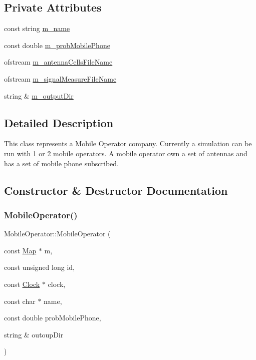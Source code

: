 \subsection*{Private Attributes}
\begin{DoxyCompactItemize}
\item 
const string \hyperlink{class_mobile_operator_adc9bb6e834adbaf7f85ad7cf9e4c9bec}{m\+\_\+name}
\item 
const double \hyperlink{class_mobile_operator_a4061b50b15ec5499d57ef0e85687c1a2}{m\+\_\+prob\+Mobile\+Phone}
\item 
ofstream \hyperlink{class_mobile_operator_abd11e27d3ed1273be761a55da1549fa4}{m\+\_\+antenna\+Cells\+File\+Name}
\item 
ofstream \hyperlink{class_mobile_operator_af9c02c4088656c0f21ecc93b7023e776}{m\+\_\+signal\+Measure\+File\+Name}
\item 
string \& \hyperlink{class_mobile_operator_a5930a7aec20f9a9c043b955cc705dce7}{m\+\_\+output\+Dir}
\end{DoxyCompactItemize}


\subsection{Detailed Description}
This class represents a Mobile Operator company. Currently a simulation can be run with 1 or 2 mobile operators. A mobile operator own a set of antennas and has a set of mobile phone subscribed. 

\subsection{Constructor \& Destructor Documentation}
\mbox{\label{class_mobile_operator_ad9649aeb34789b407d712a1539f7953d}} 
\subsubsection{\texorpdfstring{Mobile\+Operator()}{MobileOperator()}}
{\footnotesize\ttfamily Mobile\+Operator\+::\+Mobile\+Operator (\begin{DoxyParamCaption}\item[{const \hyperlink{class_map}{Map} $\ast$}]{m,  }\item[{const unsigned long}]{id,  }\item[{const \hyperlink{class_clock}{Clock} $\ast$}]{clock,  }\item[{const char $\ast$}]{name,  }\item[{const double}]{prob\+Mobile\+Phone,  }\item[{string \&}]{outoup\+Dir }\end{DoxyParamCaption})}

